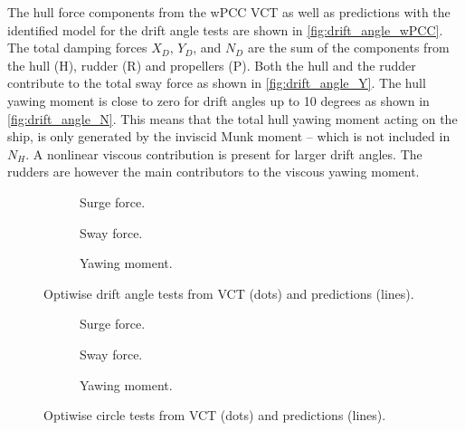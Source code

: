 The hull force components from the wPCC VCT as well as predictions with the identified model for the drift angle tests are shown in \autoref{fig:drift_angle_wPCC}. The total damping forces $X_D$, $Y_D$, and $N_D$ are the sum of the components from the hull (H), rudder (R) and propellers (P). Both the hull and the rudder contribute to the total sway force as shown in \autoref{fig:drift_angle_Y}. The hull yawing moment is close to zero for drift angles up to 10 degrees as shown in \autoref{fig:drift_angle_N}. This means that the total hull yawing moment acting on the ship, is only generated by the inviscid Munk moment -- which is not included in $N_H$. A nonlinear viscous contribution is present for larger drift angles. The rudders are however the main contributors to the viscous yawing moment.   
\begin{figure}[h]
     \centering
     \begin{subfigure}[b]{0.32\textwidth}
         \centering
         
        \caption{Surge force.}
        \label{fig:drift_angle_X}
     \end{subfigure}
     \hfill
     \begin{subfigure}[b]{0.32\textwidth}
         \centering
         
        \caption{Sway force.}
        \label{fig:drift_angle_Y}
     \end{subfigure}
     \hfill
     \begin{subfigure}[b]{0.32\textwidth}
         \centering
         
        \caption{Yawing moment.}
        \label{fig:drift_angle_N}
     \end{subfigure}
    \caption{Optiwise drift angle tests from VCT (dots) and predictions (lines).}
    \label{fig:drift_angle_wPCC}
\end{figure}
\begin{figure}[h]
     \centering
     \begin{subfigure}[b]{0.32\textwidth}
         \centering
         
        \caption{Surge force.}
        \label{fig:drift_angle_X}
     \end{subfigure}
     \hfill
     \begin{subfigure}[b]{0.32\textwidth}
         \centering
         
        \caption{Sway force.}
        \label{fig:drift_angle_Y}
     \end{subfigure}
     \hfill
     \begin{subfigure}[b]{0.32\textwidth}
         \centering
         
        \caption{Yawing moment.}
        \label{fig:drift_angle_N}
     \end{subfigure}
    \caption{Optiwise circle tests from VCT (dots) and predictions (lines).}
    \label{fig:drift_angle_wPCC}
\end{figure}
